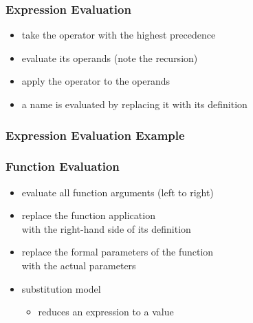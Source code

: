 \documentclass[dvipsnames]{beamer}
\theoremstyle{plain}
\begin{document}
\begin{frame}
  \frametitle{Expression Evaluation}

  \begin{itemize}
    \item take the operator with the highest precedence
    \item evaluate its operands (note the recursion)
    \item apply the operator to the operands

    \medskip
    \item a name is evaluated by replacing it with its definition
  \end{itemize}
\end{frame}

\begin{frame}
  \frametitle{Expression Evaluation Example}

  \begin{exampleblock}{}

    \pause
    \medskip

    \pause
    \medskip

    \pause
    \medskip
  \end{exampleblock}
\end{frame}

\begin{frame}
  \frametitle{Function Evaluation}

  \begin{itemize}
    \item evaluate all function arguments (left to right)
    \item replace the function application\\
      with the right-hand side of its definition
    \item replace the formal parameters of the function\\
      with the actual parameters

    \pause
    \bigskip
    \item \alert{substitution model}
    \begin{itemize}
      \item reduces an expression to a value
    \end{itemize}
  \end{itemize}
\end{frame}
\end{document}
